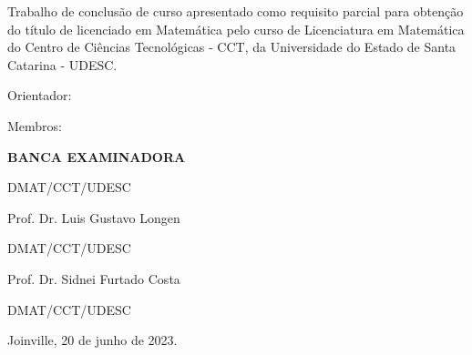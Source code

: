 \documentclass[../main.tex]{subfiles}
\begin{document}

%
% 


\begin{folhadeaprovacao}

  \begin{center}
    \textbf{\authorName}
\vspace {1 cm}

   \titleComplete 
   \vspace {1 cm}
  \end{center}
    
\begin{flushright}
  \begin{minipage}[t]{8 cm}
  { Trabalho de conclusão de curso apresentado como requisito parcial para obtenção do título de licenciado em Matemática pelo curso de Licenciatura em Matemática do Centro de Ciências Tecnológicas - CCT, da Universidade do Estado de Santa Catarina - UDESC. 

 Orientador: \orientationBy}
 
  \end{minipage}
  \end{flushright}
     
     \begin{minipage}[c]{3cm} 
	Membros:
\end{minipage}
\begin{minipage}[c]{8 cm}
	\begin{center}
	\textbf{BANCA EXAMINADORA}
	\vspace {2 cm}
	
    \orientationBy
	
    DMAT/CCT/UDESC
    
    \vspace {1.5 cm}
    
    Prof. Dr. Luis Gustavo Longen
	
    DMAT/CCT/UDESC
    
    \vspace {1.5 cm}
    
    Prof. Dr. Sidnei Furtado Costa
	
    DMAT/CCT/UDESC
    \vspace {1.5 cm}
    
    
\end{center}

\end{minipage}

\vspace*{\fill}
     \begin{center}
	     Joinville, 20 de junho de 2023.
    \end{center}

    
\end{folhadeaprovacao}
\end{document}
